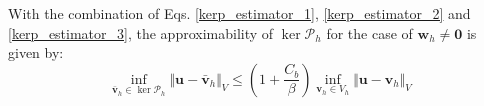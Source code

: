 With the combination of Eqs. \eqref{kerp_estimator_1}, \eqref{kerp_estimator_2} and \eqref{kerp_estimator_3}, the approximability of $\ker \mathcal P_h$ for the case of $\boldsymbol w_h \ne \boldsymbol 0$ is given by:
\begin{equation}\label{kerp_estimator}
\inf_{\bar{\boldsymbol v}_h \in \ker \mathcal P_h}\Vert \boldsymbol u - \bar{\boldsymbol v}_h \Vert_V \le (1+\frac{C_b}{\beta}) \inf_{\boldsymbol v_h \in V_h} \Vert \boldsymbol u- \boldsymbol v_h \Vert_V
\end{equation}

